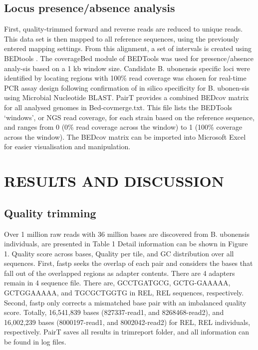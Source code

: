 \documentclass[conference]{IEEEtran}
\begin{document}
\subsection{Locus presence/absence analysis}
First, quality-trimmed forward and reverse reads are reduced to unique reads. This data set is then mapped to all reference sequences, using the previously entered mapping settings. From this alignment, a set of intervals is created using BEDtools \cite{Quinlan2010}. The coverageBed module of BEDTools was used for presence/absence analy-sis based on a 1 kb window size. Candidate B. ubonensis specific loci were identified by locating regions with 100\% read coverage was chosen for real-time PCR assay design following confirmation of in silico specificity for B. ubonen-sis using Microbial Nucleotide BLAST. PairT provides a combined BEDcov matrix for all analysed genomes in Bed-cov\textunderscore merge.txt. This file lists the BEDTools ‘windows’, or NGS read coverage, for each strain based on the reference sequence, and ranges from 0 (0\% read coverage across the window) to 1 (100\% coverage across the window). The BEDcov matrix can be imported into Microsoft Excel for easier visualisation and manipulation.
\section{RESULTS AND DISCUSSION}
\subsection{Quality trimming}
Over 1 million raw reads with 36 million bases are discovered from B. ubonensis individuals, are presented in Table 1  Detail information can be shown in Figure 1. Quality score across bases, Quality per tile, and GC distribution over all sequences. First, fastp seeks the overlap of each pair and considers the bases that fall out of the overlapped regions as adapter contents. There are 4 adapters remain in 4 sequence file. There are, GCCTGATGCG,  GCTG-GAAAAA, GCTGGAAAAA, and TGCGCTGGTG in REL,  REL sequences, respectively. Second, fastp only corrects a mismatched base pair with an imbalanced quality score. Totally, 16,541,839 bases (827337-read1, and 8268468-read2), and 16,002,239 bases (8000197-read1, and 8002042-read2) for REL, REL individuals, respectively.  PairT saves all results in trim\textunderscore report folder, and all information can be found in log files.
\end{document}
